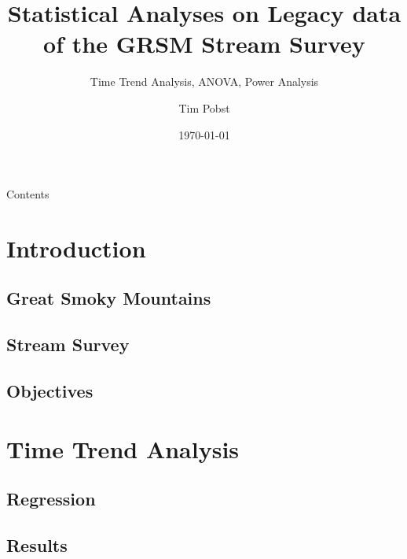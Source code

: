 \documentclass[svgnames,smaller]{beamer}
\title[Statistical Analysis] %
{Statistical Analyses on Legacy data of the GRSM Stream Survey}
\subtitle
{Time Trend Analysis, ANOVA, Power Analysis} %
\author[Pobst, Tim] %
{Tim Pobst}
\institute[University of Tennesssee Knoxville] %
{Department of Civil and Environmental Engineering\\
University of Tennessee}
\date[Thesis Defense] %
{\today}
\begin{document}
\begin{frame}
  \titlepage
\end{frame}

\begin{frame}{Contents}
  \tableofcontents
\end{frame}
\section{Introduction}
		
	\subsection{Great Smoky Mountains}
		

		

	\subsection{Stream Survey}
		

		

		
			
		

	\subsection{Objectives}
		

\section{Time Trend Analysis}

	\subsection{Regression}
		
	
		

	\subsection{Results}
		
		
\end{document}
